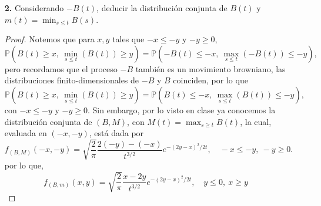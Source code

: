\documentclass[letterpaper]{article}
\renewcommand{\P}{\mathbb{P}}
\newcommand{\1}{\mathds{1}}
\theoremstyle{definition}
\theoremstyle{definition}
\theoremstyle{definition}
\theoremstyle{definition}
\theoremstyle{definition}
\begin{document}
\begin{enumerate}
\begin{itemize}
\begin{proof}
          Finalmente, la función de covarianzas del proceso es la siguiente:
          \begin{align*}
            \Gamma_X(s,t)&=\text{Cov}\left(tB(1/t),sB(1/s)\right)\\
            &=st\Gamma(1/s,1/t)\\
            &=st((1/s)\wedge(1/t))\\
            &=st(1/(s\vee t))\\
            &=s\wedge t,\\
          \end{align*}
          siempre que $s,t>0$. Obsérvese que si $s=0$, entonces directamente
          \[
          \Gamma_X(0,t)=\text{Cov}\left(X(0),X(t)\right)=\text{Cov}\left(0,X(t)\right)=0=0\wedge t.
          \]
          Análogamente en el caso $t=0$. Por lo tanto, la función de covarianzas es la de un 
          movimiento browniano y con ello, $X$ también es un movimiento browniano estándar.
         \end{proof}
    \end{itemize}

    \item [\textbf{2.}] Considerando $-B(t)$, deducir la distribución conjunta 
    de $B(t)$ y $\displaystyle m(t)=\min_{s\leq t}B(s)$.
    \begin{proof} 
       Notemos que para $x, y$ tales que $-x\leq -y$ y $-y\geq0$,
       \[
       \P\left(B(t)\geq x, \ \min_{s\leq t}(B(t))\geq y \right)=\P\left(-B(t)\leq -x, \ \max_{s\leq t}(-B(t)) \leq -y \right), 
       \]
      pero recordamos que el proceso $-B$ también es un movimiento browniano,
       las distribuciones finito-dimensionales de $-B$ y $B$ coinciden, por lo que
       \[
        \P\left(B(t)\geq x, \ \min_{s\leq t}(B(t))\geq y \right)=\P\left(B(t)\leq -x, \ \max_{s\leq t}(B(t)) \leq -y \right),
       \]
       con $-x\leq -y$ y $-y\geq0$. 
      Sin embargo, por lo visto en clase ya conocemos la distribución conjunta de $(B,M)$, con $M(t)=\max_{s\geq t} B(t)$,
      la cual, evaluada en $(-x,-y)$, está dada por
       \[
        f_{(B,M)}(-x,-y)=\sqrt{\frac{2}{\pi}}\frac{2(-y)-(-x)}{t^{3/2}}e^{-(2y-x)^2/2t}, \quad -x\leq -y,\  -y\geq0.
        \]
        por lo que, 
        \[
        f_{(B,m)}(x,y)= \sqrt{\frac{2}{\pi}}\frac{x-2y}{t^{3/2}}e^{-(2y-x)^2/2t}, \quad y \leq 0, \ x\geq y
        \]
     \end{proof}


\end{enumerate}
\end{document}
